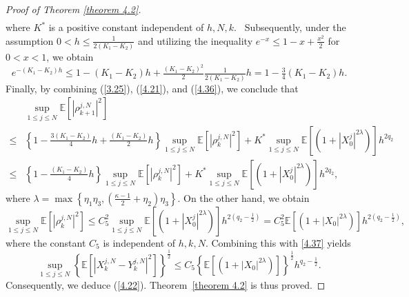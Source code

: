 \documentclass[12pt]{article}
\numberwithin{equation}{section}
\begin{document}
\begin{proof}[ Proof of Theorem \ref{theorem 4.2}]
\begin{equation}
\begin{aligned}
\end{aligned}
\end{equation}
where $K^{*}$ is a positive constant independent of $h,N, k$. \ Subsequently, under the assumption $0<h \leq \tfrac{1}{2\left(K_1-K_2\right)}$ and utilizing the inequality $e^{-x} \leq 1-x+\tfrac{x^2}{2}$ for $0<x<1$, we obtain
\begin{equation}\tag{5.49}\label{4.36}
e^{-\left( K_1-K_2 \right) h}\leq 1-\left( K_1-K_2 \right) h+\tfrac{\left( K_1-K_2 \right) ^2}{2}\tfrac{1}{2\left( K_1-K_2 \right)}h= 1-\tfrac{3}{4}\left( K_1-K_2 \right) h.
\end{equation}
 Finally, by combining (\ref{3.25}), (\ref{4.21}), and (\ref{4.36}), we conclude that
\begin{equation}\tag{5.50}\label{4.37}
\begin{aligned} 
&\underset{1\leqslant j\leqslant N}{\sup}\mathbb{E}\left[\left|\rho^{j,N}_{k+1}\right|^{2}\right] \\
\leq & \left\{1-\tfrac{3\left(K_1-K_2\right)}{4}h+\tfrac{\left(K_1-K_2\right)}{2}h\right\} \underset{1\leqslant j\leqslant N}{\sup}\mathbb{E}\left[\left|\rho^{j,N}_k\right|^{2}\right]+K^{*} \underset{1\leqslant j\leqslant N}{\sup}\mathbb{E}\left[\left(1+\left|X_0^{j}\right|^{2\lambda}\right)\right] h^{2q_2} \\
\leq & \left\{1-\tfrac{\left(K_1-K_2\right)}{4}h\right\} \underset{1\leqslant j\leqslant N}{\sup}\mathbb{E}\left[\left|\rho^{j,N}_k\right|^{2}\right]+K^{*} \underset{1\leqslant j\leqslant N}{\sup}\mathbb{E}\left[\left(1+\left|X_0^{j}\right|^{2 \lambda}\right)\right] h^{2q_2},
\end{aligned}
\end{equation}
where $\lambda=\max \left\{\eta_1\eta_3 ,\left(\tfrac{\kappa-1}{2}+\eta_2\right)\eta_3 \right\}$.
On the other hand, we obtain \begin{equation}\tag{5.51}\label{4.38}
\underset{1\leqslant j\leqslant N}{\sup}\mathbb{E}\left[\left|\rho^{j,N}_k\right|^{2}\right] \leq C^{2}_5\underset{1\leqslant j\leqslant N}{\sup}\mathbb{E}\left[\left(1+\left|X_0^{j}\right|^{2 \lambda}\right)\right] h^{2\left(q_2-\frac{1}{2}\right)}=C^{2}_5\mathbb{E}\left[\left(1+\left|X_0\right|^{2 \lambda}\right)\right] h^{2\left(q_2-\frac{1}{2}\right)},
\end{equation}
where the constant $C_5$ is independent of $h,k,N$. 
Combining this with \eqref{4.37} yields  
\begin{equation}\tag{5.52}\label{4.39}
\underset{1\leqslant j\leqslant N}{\sup}\left\{\mathbb{E}\left[\left|X^{j,N}_k-Y^{j,N}_k\right|^{2}\right]\right\}^{\frac{1}{2}} \leq C_{5}\left\{\mathbb{E}\left[\left(1+\left|X_0\right|^{2 \lambda}\right)\right]\right\}^{\frac{1}{2}} h^{q_2-\frac{1}{2}}.
\end{equation}
Consequently, we deduce (\ref{4.22}). Theorem~\ref{theorem 4.2} is thus proved. 
\end{proof} 
\end{document}
